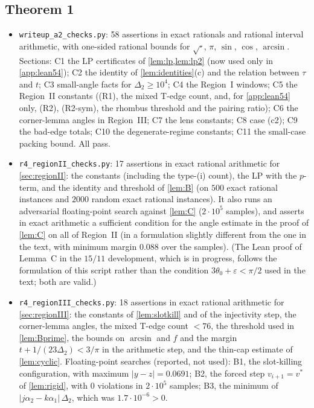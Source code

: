 \documentclass[11pt]{amsart}
\theoremstyle{definition}
\theoremstyle{remark}
\newcommand{\Dt}{\Delta_2}
\begin{document}
\subsection*{Theorem 1}
\begin{itemize}[leftmargin=2em]
\item \texttt{writeup\_a2\_checks.py}: 58 assertions in exact rationals and rational interval arithmetic, with one-sided rational bounds for $\sqrt{\cdot}$, $\pi$, $\sin$, $\cos$, $\arcsin$. Sections: C1 the LP certificates of \cref{lem:lp,lem:lp2} (now used only in \cref{app:lean54}); C2 the identity of \cref{lem:identities}(c) and the relation between $\tau$ and $t$; C3 small-angle facts for $\Dt\ge10^4$; C4 the Region~I windows; C5 the Region~II constants ((R1), the mixed T-edge count, and, for \cref{app:lean54} only, (R2), (R2-sym), the rhombus threshold and the pairing ratio); C6 the corner-lemma angles in Region~III; C7 the lens constants; C8 case (c2); C9 the bad-edge totals; C10 the degenerate-regime constants; C11 the small-case packing bound. All pass.
\item \texttt{r4\_regionII\_checks.py}: 17 assertions in exact rational arithmetic for \cref{sec:regionII}: the constants (including the type-(i) count), the LP with the $p$-term, and the identity and threshold of \cref{lem:B} (on $500$ exact rational instances and $2000$ random exact rational instances). It also runs an adversarial floating-point search against \cref{lem:C} ($2\cdot10^5$ samples), and asserts in exact arithmetic a sufficient condition for the angle estimate in the proof of \cref{lem:C} on all of Region~II (in a formulation slightly different from the one in the text, with minimum margin $0.088$ over the samples). (The Lean proof of Lemma~C in the $15/11$ development, which is in progress, follows the formulation of this script rather than the condition $3\theta_0+\varepsilon<\pi/2$ used in the text; both are valid.)
\item \texttt{r4\_regionIII\_checks.py}: 18 assertions in exact rational arithmetic for \cref{sec:regionIII}: the constants of \cref{lem:slotkill} and of the injectivity step, the corner-lemma angles, the mixed T-edge count $<76$, the threshold used in \cref{lem:Bprime}, the bounds on $\arcsin$ and $f$ and the margin $t+1/(23\Dt)<3/\pi$ in the arithmetic step, and the thin-cap estimate of \cref{lem:cyclic}. Floating-point searches (reported, not used): B1, the slot-killing configuration, with maximum $|y-z|=0.0691$; B2, the forced step $v_{i+1}=v^*$ of \cref{lem:rigid}, with $0$ violations in $2\cdot10^5$ samples; B3, the minimum of $|j\alpha_2-k\alpha_1|\,\Dt$, which was $1.7\cdot10^{-6}>0$.

\end{itemize}
\end{document}
